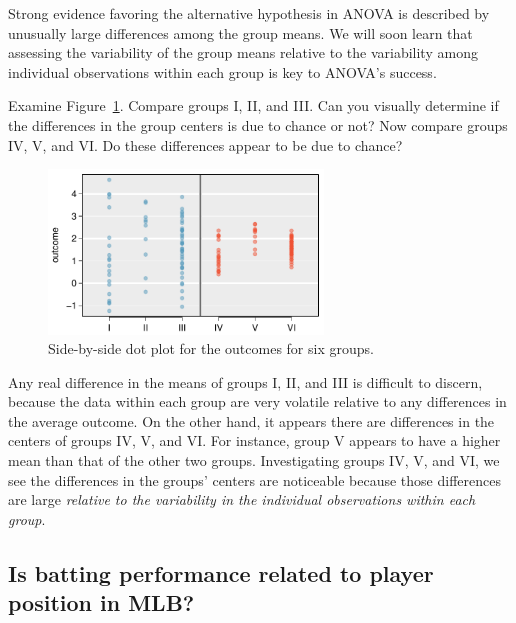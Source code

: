 Strong evidence favoring the alternative hypothesis in ANOVA is described by unusually large differences among the group means. We will soon learn that assessing the variability of the group means relative to the variability among individual observations within each group is key to ANOVA's success.

\textA{\pagebreak}

\begin{example}{Examine Figure~\ref{toyANOVA}. Compare groups I, II, and III. Can you visually determine if the differences in the group centers is due to chance or not? Now compare groups IV, V, and VI. Do these differences appear to be due to chance?}

\begin{figure}[h]
\centering
\includegraphics[width=0.65\textwidth]{ch_inference_for_means/figures/toyANOVA/toyANOVA}
\caption{Side-by-side dot plot for the outcomes for six groups.}
\label{toyANOVA}
\end{figure}

Any real difference in the means of groups I, II, and III is difficult to discern, because the data within each group are very volatile relative to any differences in the average outcome. On the other hand, it appears there are differences in the centers of groups IV, V, and VI. For instance, group V appears to have a higher mean than that of the other two groups. Investigating groups IV, V, and VI, we see the differences in the groups' centers are noticeable because those differences are large \emph{relative to the variability in the individual observations within each group}.
\end{example}


\subsection{Is batting performance related to player position in MLB?}


